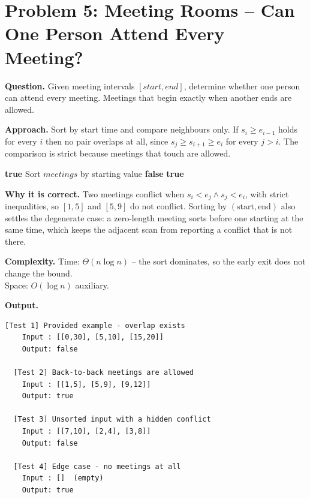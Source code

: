 \documentclass[11pt]{article}
\begin{document}
\newpage

\section*{Problem 5: Meeting Rooms -- Can One Person Attend Every Meeting?}
\textbf{Question.} Given meeting intervals $[start, end]$, determine whether one person can attend every meeting. Meetings that begin exactly when another ends are allowed.

\textbf{Approach.} Sort by start time and compare neighbours only. If $s_i \ge e_{i-1}$ holds for every $i$ then no pair overlaps at all, since $s_j \ge s_{i+1} \ge e_i$ for every $j > i$. The comparison is strict because meetings that touch are allowed.

\begin{algorithm}[H]
\caption{Can One Person Attend Every Meeting?}
\begin{algorithmic}[1]
        \State \Return \textbf{true}
    \EndIf
    \State Sort $meetings$ by starting value
            \State \Return \textbf{false} 
        \EndIf
    \EndFor
    \State \Return \textbf{true}
\EndFunction
\end{algorithmic}
\end{algorithm}

\textbf{Why it is correct.} Two meetings conflict when $s_i < e_j \wedge s_j < e_i$, with strict inequalities, so $[1,5]$ and $[5,9]$ do not conflict. Sorting by $(\text{start},\text{end})$ also settles the degenerate case: a zero-length meeting sorts before one starting at the same time, which keeps the adjacent scan from reporting a conflict that is not there.

\textbf{Complexity.} Time: $\Theta(n\log n)$ -- the sort dominates, so the early exit does not change the bound.\\
Space: $O(\log n)$ auxiliary.

\textbf{Output.}

\begin{lstlisting}[style=term]
  [Test 1] Provided example - overlap exists
    Input : [[0,30], [5,10], [15,20]]
    Output: false

  [Test 2] Back-to-back meetings are allowed
    Input : [[1,5], [5,9], [9,12]]
    Output: true

  [Test 3] Unsorted input with a hidden conflict
    Input : [[7,10], [2,4], [3,8]]
    Output: false

  [Test 4] Edge case - no meetings at all
    Input : []  (empty)
    Output: true
\end{lstlisting}
\end{document}
